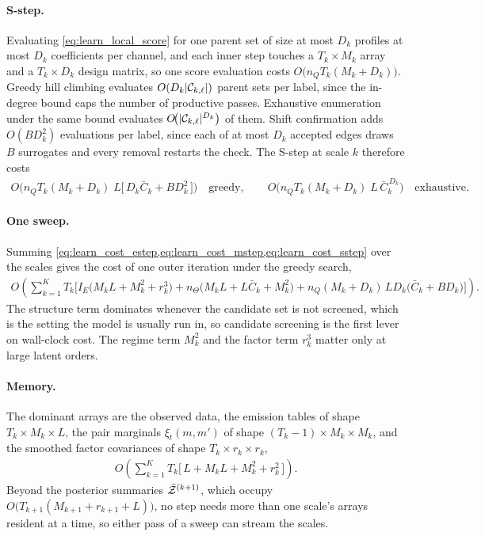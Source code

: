 \paragraph{S-step.}
Evaluating \cref{eq:learn_local_score} for one parent set of size at most $D_k$ profiles at most
$D_k$ coefficients per channel, and each inner step touches a $T_k \times M_k$ array and a
$T_k \times D_k$ design matrix, so one score evaluation costs $O\!\big(n_Q T_k (M_k + D_k)\big)$.
Greedy hill climbing evaluates $O(D_k |{\mathcal{C}}_{k,\ell}|)$ parent sets per label, since the in-degree
bound caps the number of productive passes. Exhaustive enumeration under the same bound evaluates
$O\!\big(|{\mathcal{C}}_{k,\ell}|^{D_k}\big)$ of them. Shift confirmation adds $O(B D_k^2)$ evaluations per
label, since each of at most $D_k$ accepted edges draws $B$ surrogates and every removal restarts
the check. The S-step at scale $k$ therefore costs
\begin{align}
O\!\Big(
n_Q T_k (M_k + D_k)\; L \big[\, D_k \bar{C}_k + B D_k^2 \,\big]
\Big)
\quad\text{greedy},
\qquad
O\!\Big(
n_Q T_k (M_k + D_k)\; L \, \bar{C}_k^{\,D_k}
\Big)
\quad\text{exhaustive}.
\label{eq:learn_cost_sstep}
\end{align}

\paragraph{One sweep.}
Summing \cref{eq:learn_cost_estep,eq:learn_cost_mstep,eq:learn_cost_sstep} over the scales gives
the cost of one outer iteration under the greedy search,
\begin{align}
O\!\left(
\sum_{k=1}^{K}
T_k
\Big[
I_E \big( M_k L + M_k^2 + r_k^3 \big)
+
n_\Theta \big( M_k L + L \bar{C}_k + M_k^2 \big)
+
n_Q (M_k + D_k)\, L D_k \big( \bar{C}_k + B D_k \big)
\Big]
\right).
\label{eq:learn_cost_sweep}
\end{align}
The structure term dominates whenever the candidate set is not screened, which is the setting the
model is usually run in, so candidate screening is the first lever on wall-clock cost. The regime
term $M_k^2$ and the factor term $r_k^3$ matter only at large latent orders.

\paragraph{Memory.}
The dominant arrays are the observed data, the emission tables of shape
$T_k \times M_k \times L$, the pair marginals $\xi_t(m,m')$ of shape
$(T_k - 1) \times M_k \times M_k$, and the smoothed factor covariances of shape
$T_k \times r_k \times r_k$,
\begin{align}
O\!\left(
\sum_{k=1}^{K}
T_k
\big[\, L + M_k L + M_k^2 + r_k^2 \,\big]
\right).
\label{eq:learn_cost_memory}
\end{align}
Beyond the posterior summaries $\bar{{\mathcal{Z}}}^{(k+1)}$, which occupy
$O\!\big(T_{k+1}(M_{k+1} + r_{k+1} + L)\big)$, no step needs more than one scale's arrays
resident at a time, so either pass of a sweep can stream the scales.

